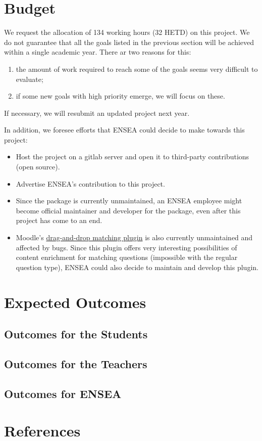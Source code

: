 \documentclass[twocolumn,a4paper,9pt]{article}
\begin{document}
\section{Budget}

We request the allocation of 134 working hours (32 HETD) on this project. 
We do not guarantee that all the goals listed in the previous section will be 
achieved within a single academic year. There ar two reasons for this:
\begin{enumerate}
	\item the amount of work required to reach some of the goals seems very 
	difficult to evaluate;
	\item if some new goals with high priority emerge, we will focus on these.
\end{enumerate}
If necessary, we will resubmit an updated project next year.

In addition, we foresee efforts that ENSEA could decide to make towards this 
project:
\begin{itemize}
\item Host the project on a gitlab server and open it to third-party 
contributions (open source).
\item Advertise ENSEA's contribution to this project.
\item Since the package is currently unmaintained, an ENSEA employee might 
become official maintainer and developer for the package, even after this 
project has come to an end.
\item Moodle's 
\href{https://github.com/jmvedrine/moodle-qtype_ddmatch}{drag-and-drop 
matching plugin} is also currently unmaintained and 
affected by bugs. Since this plugin offers very interesting possibilities 
of content enrichment for matching questions (impossible with the regular 
question type), ENSEA could also decide to maintain and develop this plugin.
\end{itemize}

\section{Expected Outcomes}

\subsection{Outcomes for the Students}

\subsection{Outcomes for the Teachers}

\subsection{Outcomes for ENSEA}

\section*{References}
\end{document}
